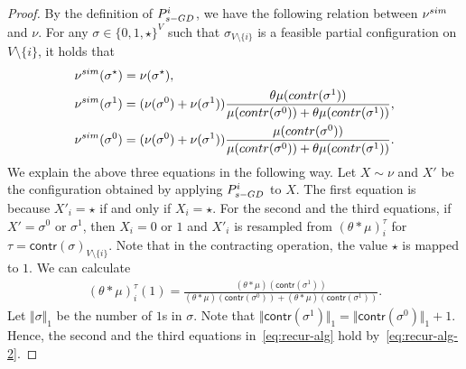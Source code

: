 \documentclass[10pt,a4paper]{amsart}
\newcommand{\nus}{\nu^{\textnormal{sim}}}
\begin{document}
\begin{proof}
By the definition of $P^i_{s\textnormal{-GD}}$,
we have the following relation between $\nus$ and $\nu$. For any $\sigma\in \{0,1,\star\}^V$ such that $\sigma_{V \setminus \{i\}}$ is a feasible partial configuration on $V \setminus \{i\}$, it holds that
\begin{align}\label{eq:recur-alg}
\begin{split}
&\nus(\sigma^{\star}) = \nu(\sigma^{\star}),\\
&\nus(\sigma^1)=(\nu(\sigma^0)+\nu(\sigma^1))\frac{\theta \mu(\textsf{contr}(\sigma^1))}{\mu(\textsf{contr}(\sigma^0))+\theta \mu(\textsf{contr}(\sigma^1))},\\
&\nus(\sigma^0)=(\nu(\sigma^0)+\nu(\sigma^1))\frac{\mu(\textsf{contr}(\sigma^0))}{\mu(\textsf{contr}(\sigma^0))+\theta \mu(\textsf{contr}(\sigma^1))}.
\end{split}
\end{align}
We explain the above three equations in the following way. Let $X \sim \nu$ and $X'$ be the configuration obtained by applying $P^i_{s\textnormal{-GD}}$ to $X$.
The first equation is because $X'_i = \star$ if and only if $X_i = \star$.
For the second and the third equations, if $X' = \sigma^0$ or $\sigma^1$, then $X_i = 0$ or $1$ and $X'_i$ is resampled from $(\theta * \mu)_i^\tau$ for $\tau = \textsf{contr}(\sigma)_{V \setminus \{i\}}$. Note that in the contracting operation, the value $\star$ is mapped to $1$. We can calculate
\begin{align}\label{eq:recur-alg-2}
    (\theta * \mu)_i^{\tau}(1) = \frac{(\theta * \mu)(\textsf{contr}(\sigma^1))}{(\theta * \mu)(\textsf{contr}(\sigma^0))+(\theta * \mu)(\textsf{contr}(\sigma^1))}.
\end{align}
Let $\Vert \sigma \Vert_1$ be the number of $1$s in $\sigma$. Note that $\Vert \textsf{contr}(\sigma^1) \Vert_1 = \Vert \textsf{contr}(\sigma^0) \Vert_1 + 1$. Hence, the second and the third equations in~\eqref{eq:recur-alg} hold by~\eqref{eq:recur-alg-2}.


\end{proof}
\end{document}

